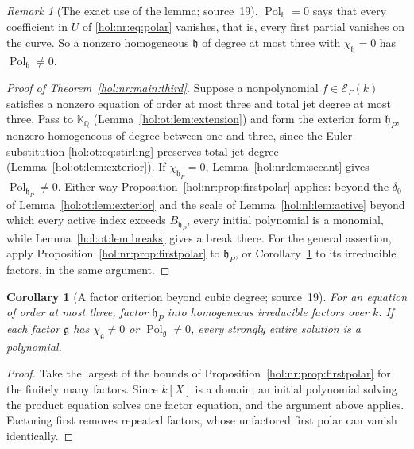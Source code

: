 \documentclass[11pt]{article}
\numberwithin{equation}{section}
\newtheorem{corollary}[theorem]{Corollary}
\theoremstyle{definition}
\theoremstyle{remark}
\newtheorem{remark}[theorem]{Remark}
\newcommand{\Q}{\mathbb Q}
\newcommand{\KK}{\mathbb K}
\newcommand{\EK}{\mathcal E_\Gamma(k)}
\begin{document}
\begin{remark}[The exact use of the lemma; source~19]
\label{hol:nr:rem:exactuse}
$\operatorname{Pol}_{\mathfrak h}=0$ says that every coefficient in $U$ of
\eqref{hol:nr:eq:polar} vanishes, that is, every first partial vanishes on the
curve. So a nonzero homogeneous $\mathfrak h$ of degree at most three with
$\chi_{\mathfrak h}=0$ has $\operatorname{Pol}_{\mathfrak h}\ne0$.
\end{remark}

\begin{proof}[Proof of Theorem~\ref{hol:nr:main:third}]
Suppose a nonpolynomial $f\in\EK$ satisfies a nonzero equation of order at
most three and total jet degree at most three. Pass to $\KK_\Q$
(Lemma~\ref{hol:ot:lem:extension}) and form the exterior form $\mathfrak h_P$,
nonzero homogeneous of degree between one and three, since the Euler
substitution \eqref{hol:ot:eq:stirling} preserves total jet degree
(Lemma~\ref{hol:ot:lem:exterior}). If $\chi_{\mathfrak h_P}=0$,
Lemma~\ref{hol:nr:lem:secant} gives $\operatorname{Pol}_{\mathfrak h_P}\ne0$.
Either way Proposition~\ref{hol:nr:prop:firstpolar} applies: beyond the
$\delta_0$ of Lemma~\ref{hol:ot:lem:exterior} and the scale of
Lemma~\ref{hol:nl:lem:active} beyond which every active index exceeds
$B_{\mathfrak h_P}$, every initial polynomial is a monomial, while
Lemma~\ref{hol:ot:lem:breaks} gives a break there. For the general assertion,
apply Proposition~\ref{hol:nr:prop:firstpolar} to $\mathfrak h_P$, or
Corollary~\ref{hol:nr:cor:factor} to its irreducible factors, in the same
argument.
\end{proof}

\begin{corollary}[A factor criterion beyond cubic degree; source~19]
\label{hol:nr:cor:factor}
For an equation of order at most three, factor $\mathfrak h_P$ into
homogeneous irreducible factors over $k$. If each factor $\mathfrak g$ has
$\chi_{\mathfrak g}\ne0$ or $\operatorname{Pol}_{\mathfrak g}\ne0$, every
strongly entire solution is a polynomial.
\end{corollary}

\begin{proof}
Take the largest of the bounds of Proposition~\ref{hol:nr:prop:firstpolar} for
the finitely many factors. Since $k[X]$ is a domain, an initial polynomial
solving the product equation solves one factor equation, and the argument
above applies. Factoring first removes repeated factors, whose unfactored first
polar can vanish identically.
\end{proof}
\end{document}
